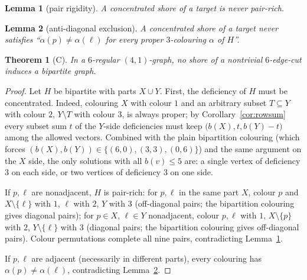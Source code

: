 \documentclass[10pt,a4paper]{amsart}
\newtheorem{lemma}{Lemma}
\newtheorem{theorem}{Theorem}
\begin{document}
\begin{lemma}[pair rigidity]\label{lem:pairrigid}
A concentrated shore of a target is never pair-rich.
\end{lemma}

\begin{lemma}[anti-diagonal exclusion]\label{lem:antidiag}
A concentrated shore of a target never satisfies
``$\alpha(p)\ne\alpha(\ell)$ for every proper $3$-colouring $\alpha$ of $H$''.
\end{lemma}

\begin{theorem}[C]\label{thm:C}
In a $6$-regular $(4,1)$-graph, no shore of a nontrivial $6$-edge-cut induces a
bipartite graph.
\end{theorem}

\begin{proof}
Let $H$ be bipartite with parts $X\cup Y$. First, the deficiency of $H$ must be
concentrated. Indeed, colouring $X$ with colour $1$ and an arbitrary subset
$T\subseteq Y$ with colour $2$, $Y\setminus T$ with colour $3$, is always proper;
by Corollary~\ref{cor:rowsum} every subset sum $t$ of the $Y$-side deficiencies
must keep $\bigl(b(X),t,b(Y)-t\bigr)$ among the allowed vectors. Combined with
the plain bipartition colouring (which forces
$(b(X),b(Y))\in\{(6,0),(3,3),(0,6)\}$) and the same argument on the $X$ side,
the only solutions with all $b(v)\le 5$ are: a single vertex of deficiency $3$
on each side, or two vertices of deficiency $3$ on one side.

If $p,\ell$ are nonadjacent, $H$ is pair-rich: for $p,\ell$ in the same part
$X$, colour $p$ and $X\setminus\{\ell\}$ with $1$, $\ell$ with $2$, $Y$ with $3$
(off-diagonal pairs; the bipartition colouring gives diagonal pairs); for
$p\in X$, $\ell\in Y$ nonadjacent, colour $p,\ell$ with $1$, $X\setminus\{p\}$
with $2$, $Y\setminus\{\ell\}$ with $3$ (diagonal pairs; the bipartition
colouring gives off-diagonal pairs). Colour permutations complete all nine
pairs, contradicting Lemma~\ref{lem:pairrigid}.

If $p,\ell$ are adjacent (necessarily in different parts), every colouring has
$\alpha(p)\ne\alpha(\ell)$, contradicting Lemma~\ref{lem:antidiag}.
\end{proof}
\end{document}
